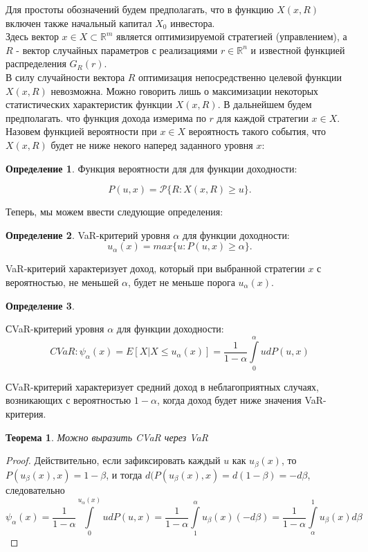 \documentclass[18pt,a4paper]{article}
\theoremstyle{plain}
\newtheorem{Th}{Теорема}[section]
\theoremstyle{definition}
\newtheorem{Def}{Определение}[section]
\begin{document}
Для простоты обозначений будем предполагать, что в функцию $X(x, R)$ включен также начальный капитал $X_0$ инвестора.\\
Здесь вектор $x \in X \subset \mathbb{R}^m$ является оптимизируемой стратегией (управлением), а $R$ - вектор случайных параметров с реализациями $r \in \mathbb{R}^n$ и известной функцией распределения $G_R(r)$.\\
В силу случайности вектора $R$ оптимизация непосредственно целевой функции  $X(x,R)$ невозможна. Можно говорить лишь о максимизации некоторых статистических характеристик функции  $X(x,R)$. В дальнейшем будем предполагать. что функция дохода измерима по $r$ для каждой стратегии $x \in X$.\\
Назовем функцией вероятности при $x \in X$ вероятность такого события, что $X(x,R)$ будет не ниже некого наперед заданного уровня $x$:
\begin{Def} \label{main}
Функция вероятности для для функции доходности:

$$
P(u,x) =  \mathcal{P}\{R:X(x,R) \ge u\}.
$$
\end{Def}
Теперь, мы можем ввести следующие определения:\\

\begin{Def} \label{main}
VaR-критерий уровня $\alpha$ для функции доходности:
$$
u_\alpha(x)=max\{u:P(u, x)\ge \alpha\}.
$$
\end{Def}

VaR-критерий характеризует доход, который при выбранной стратегии $x$ с вероятностью, не меньшей $\alpha$, будет не меньше порога $u_\alpha(x)$.


\begin{Def} \label{main}

СVaR-критерий уровня $\alpha$ для функции доходности:
$$
CVaR: \psi_\alpha (x) = E[X | X \le u_\alpha (x)] = \frac{1}{1-\alpha} \int\limits_{0}^{\alpha} u dP(u,x)
$$
\end{Def}

СVaR-критерий характеризует средний доход в неблагоприятных случаях, возникающих с вероятностью $1-\alpha$, когда доход будет ниже значения VaR-критерия.\\

\begin{Th} \label{main} Можно выразить CVaR через VaR
\end{Th}
\begin{proof}
Действительно, если зафиксировать каждый $u$ как $u_\beta (x)$, то $P(u_\beta (x),x) = 1-\beta$, и тогда $d(P(u_\beta (x),x) = d(1-\beta) =  -d\beta$, следовательно \\
$$
\psi_\alpha (x) = \frac{1}{1-\alpha} \int\limits_{0}^{u_\alpha (x)} u dP(u,x) = \frac{1}{1-\alpha} \int\limits_{1}^{\alpha} u_\beta (x) (-d\beta) = \frac{1}{1-\alpha} \int \limits_{\alpha}^{1} u_\beta (x) d\beta
$$
\end{proof}
\end{document}
